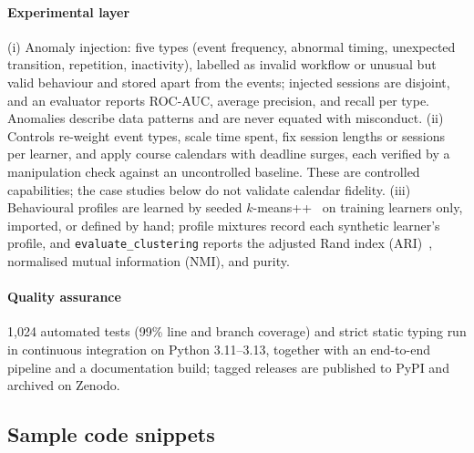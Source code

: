 \documentclass[preprint,12pt]{elsarticle}
\begin{document}
\paragraph{Experimental layer} (i) Anomaly injection: five types (event
frequency, abnormal timing, unexpected transition, repetition, inactivity),
labelled as invalid workflow or unusual but valid behaviour and stored apart
from the events; injected sessions are disjoint, and an evaluator reports
ROC-AUC, average precision, and recall per type. Anomalies describe data
patterns and are never equated with misconduct. (ii) Controls re-weight
event types, scale time spent, fix session lengths or sessions per learner,
and apply course calendars with deadline surges, each verified by a
manipulation check against an uncontrolled baseline. These are controlled
capabilities; the case studies below do not validate calendar fidelity.
(iii) Behavioural profiles are learned by seeded
$k$-means++~\cite{arthur2007kmeanspp} on training learners only, imported, or
defined by hand; profile mixtures record each synthetic learner's profile,
and \texttt{evaluate\_clustering} reports the adjusted Rand index
(ARI)~\cite{hubert1985ari}, normalised mutual information (NMI), and purity.

\paragraph{Quality assurance} 1{,}024 automated tests (99\% line and branch
coverage) and strict static typing run in continuous integration on Python
3.11--3.13, together with an end-to-end pipeline and a documentation build;
tagged releases are published to PyPI and archived on Zenodo.

\subsection{Sample code snippets}
\end{document}
